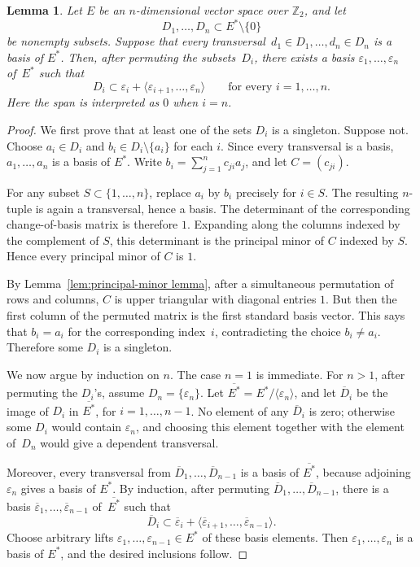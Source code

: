 \documentclass{amsart}
\newtheorem{lemma}[theorem]{Lemma}
\numberwithin{equation}{section}
\theoremstyle{definition}
\theoremstyle{remark}
\newcommand{\Z}{\mathbb Z}
\begin{document}
\begin{lemma} \label{lem:colored triangularization}
    Let $E$ be an $n$-dimensional vector space over $\Z_2$, and let
    $$
        D_1,\ldots,D_n\subset E^\ast\setminus\{0\}
    $$
    be nonempty subsets.
    Suppose that every transversal~$d_1\in D_1,\ldots,d_n\in D_n$ is a basis of $E^\ast$.
    Then, after permuting the subsets~$D_i$, there exists a basis $\varepsilon_1,\ldots,\varepsilon_n$ of~$E^\ast$ such that
    $$
        D_i\subset \varepsilon_i+ \langle \varepsilon_{i+1},\ldots,\varepsilon_n\rangle \qquad \text{for every } i=1,\ldots,n.
    $$
    Here the span is interpreted as $0$ when $i=n$.
\end{lemma}
\begin{proof}
    We first prove that at least one of the sets $D_i$ is a singleton.
    Suppose not.
    Choose $a_i\in D_i$ and $b_i\in D_i\setminus\{a_i\}$ for each $i$.
    Since every transversal is a basis, $a_1,\ldots,a_n$ is a basis of $E^\ast$.
    Write $b_i=\sum_{j=1}^n c_{ji}a_j$, and let $C=(c_{ji})$.
        
    For any subset $S\subset\{1,\ldots,n\}$, replace $a_i$ by $b_i$ precisely for $i\in S$.
    The resulting $n$-tuple is again a transversal, hence a basis.
    The determinant of the corresponding change-of-basis matrix is therefore $1$.
    Expanding along the columns indexed by the complement of $S$, this determinant is the principal minor of $C$ indexed by $S$.
    Hence every principal minor of $C$ is $1$.
        
    By Lemma~\ref{lem:principal-minor lemma}, after a simultaneous permutation of rows and columns, $C$ is upper triangular with diagonal entries $1$.
    But then the first column of the permuted matrix is the first standard basis vector.
    This says that $b_i=a_i$ for the corresponding index~$i$, contradicting the choice $b_i\neq a_i$.
    Therefore some $D_i$ is a singleton.
        
    We now argue by induction on $n$.
    The case $n=1$ is immediate.
    For $n>1$, after permuting the $D_i$'s, assume $D_n=\{\varepsilon_n\}$.
    Let $\overline{E^\ast}=E^\ast/\langle \varepsilon_n\rangle$, and let $\overline D_i$ be the image of $D_i$ in $\overline{E^\ast}$, for $i=1,\ldots,n-1$.
    No element of any $\overline D_i$ is zero; otherwise some $D_i$ would contain $\varepsilon_n$, and choosing this element together with the element of~$D_n$ would give a dependent transversal.
        
    Moreover, every transversal from $\overline D_1,\ldots,\overline D_{n-1}$ is a basis of $\overline{E^\ast}$, because adjoining $\varepsilon_n$ gives a basis of $E^\ast$.
    By induction, after permuting $\overline D_1,\ldots,\overline D_{n-1}$, there is a basis $\overline\varepsilon_1,\ldots,\overline\varepsilon_{n-1}$ of~$\overline{E^\ast}$ such that
    $$
        \overline D_i\subset \overline\varepsilon_i+ \langle \overline\varepsilon_{i+1},\ldots, \overline\varepsilon_{n-1} \rangle.
    $$
    Choose arbitrary lifts $\varepsilon_1,\ldots,\varepsilon_{n-1}\in E^\ast$ of these basis elements.
    Then $\varepsilon_1,\ldots,\varepsilon_n$ is a basis of $E^\ast$, and the desired inclusions follow.
\end{proof}
\end{document}
